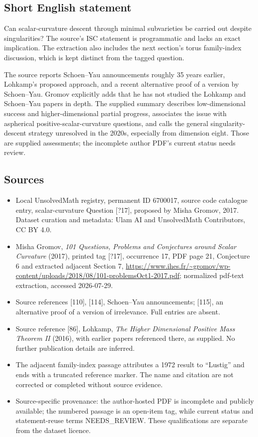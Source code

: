 \documentclass[11pt]{article}
\begin{document}
\subsection{Short English statement}
Can scalar-curvature descent through minimal subvarieties be carried out despite singularities? The source's ISC statement is programmatic and lacks an exact implication. The extraction also includes the next section's torus family-index discussion, which is kept distinct from the tagged question.

The source reports Schoen--Yau announcements roughly 35 years earlier, Lohkamp's proposed approach, and a recent alternative proof of a version by Schoen--Yau. Gromov explicitly adds that he has not studied the Lohkamp and Schoen--Yau papers in depth. The supplied summary describes low-dimensional success and higher-dimensional partial progress, associates the issue with aspherical positive-scalar-curvature questions, and calls the general singularity-descent strategy unresolved in the 2020s, especially from dimension eight. Those are supplied assessments; the incomplete author PDF's current status needs review.
\subsection{Sources}
\begin{itemize}
\item Local UnsolvedMath registry, permanent ID 6700017, source code catalogue entry, scalar-curvature Question [?17], proposed by Misha Gromov, 2017. Dataset curation and metadata: Ulam AI and UnsolvedMath Contributors, CC BY 4.0.
\item Misha Gromov, \emph{101 Questions, Problems and Conjectures around Scalar Curvature} (2017), printed tag [?17], occurrence 17, PDF page 21, Conjecture 6 and extracted adjacent Section 7, \url{https://www.ihes.fr/~gromov/wp-content/uploads/2018/08/101-problemsOct1-2017.pdf}; normalized pdf-text extraction, accessed 2026-07-29.
\item Source references [110], [114], Schoen--Yau announcements; [115], an alternative proof of a version of irrelevance. Full entries are absent.
\item Source reference [86], Lohkamp, \emph{The Higher Dimensional Positive Mass Theorem II} (2016), with earlier papers referenced there, as supplied. No further publication details are inferred.
\item The adjacent family-index passage attributes a 1972 result to ``Lustig'' and ends with a truncated reference marker. The name and citation are not corrected or completed without source evidence.
\item Source-specific provenance: the author-hosted PDF is incomplete and publicly available; the numbered passage is an open-item tag, while current status and statement-reuse terms NEEDS\_REVIEW. These qualifications are separate from the dataset licence.
\end{itemize}
\end{document}
